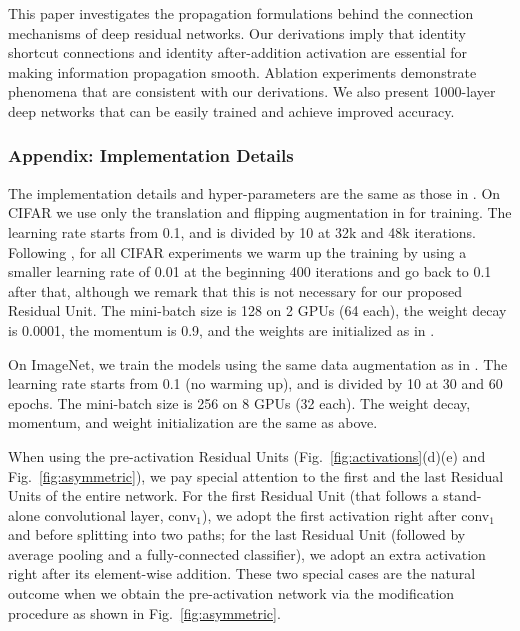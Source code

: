 \documentclass[runningheads]{llncs}
\begin{document}
This paper investigates the propagation formulations behind the connection mechanisms of deep residual networks. Our derivations imply that identity shortcut connections and identity after-addition activation are essential for making information propagation smooth. Ablation experiments demonstrate phenomena that are consistent with our derivations. We also present 1000-layer deep networks that can be easily trained and achieve improved accuracy.

\subsubsection*{Appendix: Implementation Details}

The implementation details and hyper-parameters are the same as those in \cite{He2016}. On CIFAR we use only the translation and flipping augmentation in \cite{He2016} for training. The learning rate starts from 0.1, and is divided by 10 at 32k and 48k iterations. Following \cite{He2016}, for all CIFAR experiments we warm up the training by using a smaller learning rate of 0.01 at the beginning 400 iterations and go back to 0.1 after that, although we remark that this is not necessary for our proposed Residual Unit. The mini-batch size is 128 on 2 GPUs (64 each), the weight decay is 0.0001, the momentum is 0.9, and the weights are initialized as in \cite{He2015}.

On ImageNet, we train the models using the same data augmentation as in \cite{He2016}. The learning rate starts from 0.1 (no warming up), and is divided by 10 at 30 and 60 epochs. The mini-batch size is 256 on 8 GPUs (32 each). The weight decay, momentum, and weight initialization are the same as above.

When using the pre-activation Residual Units (Fig.~\ref{fig:activations}(d)(e) and Fig.~\ref{fig:asymmetric}), we pay special attention to the first and the last Residual Units of the entire network. For the first Residual Unit (that follows a stand-alone convolutional layer, conv$_1$), we adopt the first activation right after conv$_1$ and before splitting into two paths; for the last Residual Unit (followed by average pooling and a fully-connected classifier), we adopt an extra activation right after its element-wise addition.
These two special cases are the natural outcome when we obtain the pre-activation network via the modification procedure as shown in Fig.~\ref{fig:asymmetric}.

\newcommand{\blocka}[1]{\tiny \begin{tabular}{c} \(\left[\begin{array}{c}\text{3$\times$3, #1}\\ \text{3$\times$3, #1} \end{array}\right]\)\end{tabular}
}
\newcommand{\blockb}[2]{\tiny \begin{tabular}{c} \(\left[\begin{array}{c}\text{1$\times$1, #2}\\[-.1em] \text{3$\times$3, #2}\\[-.1em] \text{1$\times$1, #1}\end{array}\right]\)\end{tabular}
}
\end{document}
